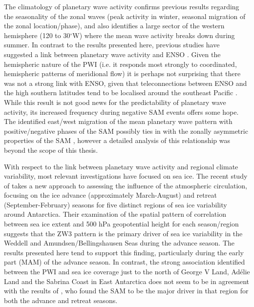 The climatology of planetary wave activity confirms previous results regarding the seasonality of the zonal waves (peak activity in winter, seasonal migration of the zonal location/phase), and also identifies a large sector of the western hemisphere (120 to 30$^{\circ}$W) where the mean wave activity breaks down during summer. In contrast to the results presented here, previous studies have suggested a link between planetary wave activity and ENSO \citep[e.g.][]{Trenberth1980,Raphael2003,Hobbs2007}. Given the hemispheric nature of the PWI (i.e. it responds most strongly to coordinated, hemispheric patterns of meridional flow) it is perhaps not surprising that there was not a strong link with ENSO, given that teleconnections between ENSO and the high southern latitudes tend to be localised around the southeast Pacific \citep{Simmonds1995,Turner2004}. While this result is not good news for the predictability of planetary wave activity, its increased frequency during negative SAM events offers some hope. The identified east/west migration of the mean planetary wave pattern with positive/negative phases of the SAM possibly ties in with the zonally asymmetric properties of the SAM \citep[e.g.][]{Kidson1988,Kidston2009}, however a detailed analysis of this relationship was beyond the scope of this thesis.

With respect to the link between planetary wave activity and regional climate variability, most relevant investigations have focused on sea ice. The recent study of \citet{Raphael2014} takes a new approach to assessing the influence of the atmospheric circulation, focusing on the ice advance (approximately March-August) and retreat (September-February) seasons for five distinct regions of sea ice variability around Antarctica. Their examination of the spatial pattern of correlation between sea ice extent and 500 hPa geopotential height for each season/region suggests that the ZW3 pattern is the primary driver of sea ice variability in the Weddell and Amundsen/Bellingshausen Seas during the advance season. The results presented here tend to support this finding, particularly during the early part (MAM) of the advance season. In contrast, the strong association identified between the PWI and sea ice coverage just to the north of George V Land, Ad{\'e}lie Land and the Sabrina Coast in East Antarctica does not seem to be in agreement with the results of \citet{Raphael2014}, who found the SAM to be the major driver in that region for both the advance and retreat seasons.

